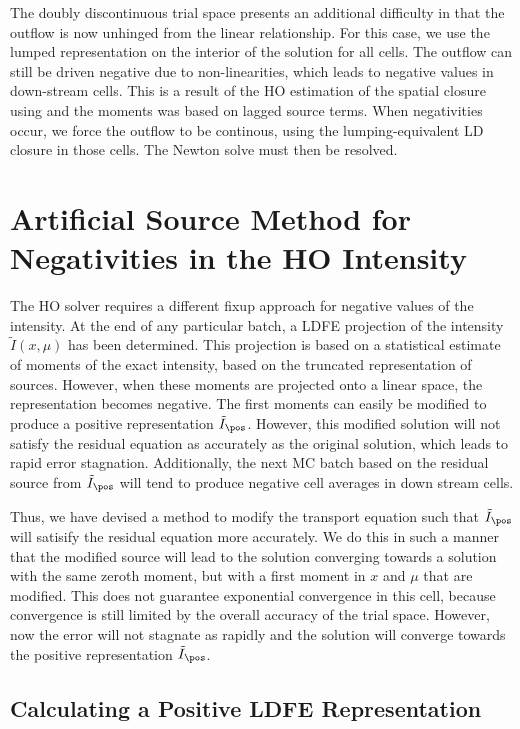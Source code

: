 The doubly discontinuous trial space presents an additional difficulty in that the outflow
is now unhinged from the linear relationship.  For this case, we use the lumped
representation on the interior of the solution for all cells. The outflow can still be driven negative
due to non-linearities, which leads to negative values in down-stream cells. 
This is a result of the HO estimation of the spatial closure using
and the moments was based on lagged source terms.  When negativities occur, we force the
outflow to be continous, using the lumping-equivalent LD closure in those cells.  The
Newton solve must then be resolved.


\section{Artificial Source Method for Negativities in the HO Intensity}

The HO solver requires a different fixup approach for negative values of the intensity.
At the end of any particular batch, a LDFE projection of the intensity $\tilde I(x,\mu)$
has been determined.  This projection is based on a statistical estimate of moments of the
exact intensity, based on the truncated representation of sources.  However, when these moments are
projected onto a linear space, the representation becomes negative.  The first
moments can easily be modified to produce a positive representation $\tilde I_{\pos}$.
However, this modified solution will
not satisfy the residual equation as accurately as the original solution, which leads to
rapid error stagnation.  Additionally, the next MC batch based on the residual source from
$\tilde I_{\pos}$ will tend to produce negative cell averages in down stream cells.

Thus, we have devised
a method to modify the transport equation such that $\tilde I_{\pos}$ will satisify the
residual equation more accurately.  We do this in such a manner that the
modified source will lead to the solution converging towards a solution with the same
zeroth moment, but with a first moment in $x$ and $\mu$ that are modified.  This does not
guarantee exponential convergence in this cell, because convergence is still limited by
the overall accuracy of the trial space.  However, now the error will not stagnate as rapidly
and the solution will converge towards the positive representation $\tilde I_{\pos}$.

\subsection{Calculating a Positive LDFE Representation}

